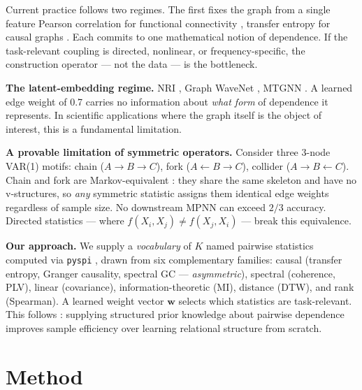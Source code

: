 \documentclass{article}
\begin{document}
Current practice follows two regimes. The first fixes the graph from a single feature Pearson correlation for functional connectivity \citep{bullmore2009}, transfer entropy for causal graphs \citep{duan2023}. Each commits to one mathematical notion of dependence. If the task-relevant coupling is directed, nonlinear, or frequency-specific, the construction operator --- not the data --- is the bottleneck.

\textbf{The latent-embedding regime.} NRI \citep{kipf2018}, Graph WaveNet \citep{wu2019}, MTGNN \citep{wu2020}. A learned edge weight of 0.7 carries no information about \emph{what form} of dependence it represents. In scientific applications where the graph itself is the object of interest, this is a fundamental limitation.

\textbf{A provable limitation of symmetric operators.}
Consider three 3-node VAR(1) motifs: chain ($A {\to} B {\to} C$), fork ($A {\leftarrow} B {\to} C$), collider ($A {\to} B {\leftarrow} C$). Chain and fork are Markov-equivalent \citep{verma1990}: they share the same skeleton and have no v-structures, so \emph{any} symmetric statistic assigns them identical edge weights regardless of sample size. No downstream MPNN can exceed $2/3$ accuracy. Directed statistics --- where $f(X_i, X_j) \neq f(X_j, X_i)$ --- break this equivalence.

\textbf{Our approach.} We supply a \emph{vocabulary} of $K$ named pairwise statistics computed via \texttt{pyspi} \citep{cliff2023}, drawn from six complementary families: causal (transfer entropy, Granger causality, spectral GC --- \emph{asymmetric}), spectral (coherence, PLV), linear (covariance), information-theoretic (MI), distance (DTW), and rank (Spearman). A learned weight vector $\mathbf{w}$ selects which statistics are task-relevant. This follows \citet{velickovic2022}: supplying structured prior knowledge about pairwise dependence improves sample efficiency over learning relational structure from scratch.

\section{Method}
\label{sec:method}
\end{document}
